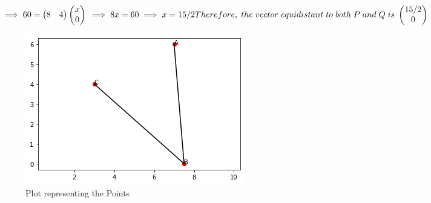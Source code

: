 \documentclass{article}
\begin{document}
\begin{math}
 \implies 60 = \begin{pmatrix} 8 & 4 \end{pmatrix}\begin{pmatrix} x \\ 0 \\ \end{pmatrix} \newline \newline
 \implies 8x = 60 \newline \newline
 \implies x = 15/2 \newline \newline
 Therefore, \hspace{0.1cm} the \hspace{0.1cm} vector \hspace{0.1cm} equidistant \hspace{0.1cm} to \hspace{0.1cm} both \hspace{0.1cm} P \hspace{0.1cm} and \hspace{0.1cm} Q \hspace{0.1cm} is \hspace{0.1cm} \begin{pmatrix} 15/2 \\ 0 \\ \end{pmatrix}
 \end{math}
\begin{figure}
\centering
\includegraphics{Plot.png}
\caption{Plot representing the Points}
\label{Fig.1}
\end{figure}
\end{document}
